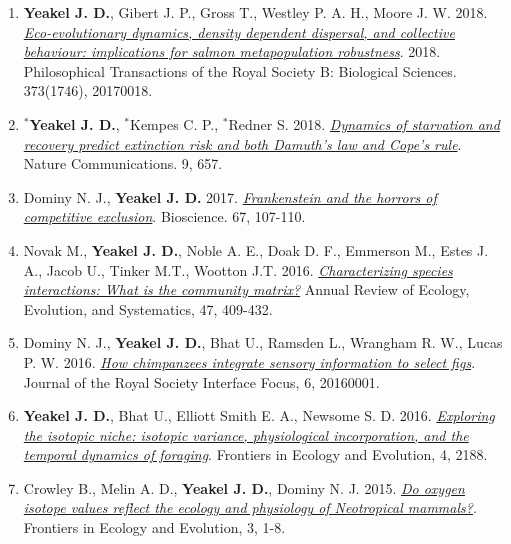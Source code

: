 \documentclass[margin,line,12pt]{res}
\begin{document}
\begin{resume}
\begin{enumerate}
\item \textbf{Yeakel J. D.}, Gibert J. P., Gross T., Westley P. A. H., Moore J. W. 2018. \href{https://royalsocietypublishing.org/doi/10.1098/rstb.2017.0018}{\emph{Eco-evolutionary dynamics, density dependent dispersal, and collective behaviour: implications for salmon metapopulation robustness}}. 2018. Philosophical Transactions of the Royal Society B: Biological Sciences. 373(1746), 20170018.

\item \textbf{${}^\ast$Yeakel J. D.}, ${}^\ast$Kempes C. P., ${}^\ast$Redner S. 2018. \href{https://www.nature.com/articles/s41467-018-02822-y}{\emph{Dynamics of starvation and recovery predict extinction risk and both Damuth's law and Cope's rule}}. Nature Communications. 9, 657.

\item Dominy N. J., \textbf{Yeakel J. D.} 2017. \href{https://academic.oup.com/bioscience/article-pdf/67/2/107/10251235/biw133.pdf}{\emph{Frankenstein and the horrors of competitive exclusion}}. Bioscience. 67, 107-110.

\item Novak M., \textbf{Yeakel J. D.}, Noble A. E., Doak D. F., Emmerson M., Estes J. A., Jacob U., Tinker M.T., Wootton J.T. 2016. \href{https://pubs.er.usgs.gov/publication/70173930}{\emph{Characterizing species interactions: What is the community matrix?}} Annual Review of Ecology, Evolution, and Systematics, 47, 409-432.

\item Dominy N. J., \textbf{Yeakel J. D.}, Bhat U., Ramsden L., Wrangham R. W., Lucas P. W. 2016. \href{https://royalsocietypublishing.org/doi/full/10.1098/rsfs.2016.0001}{\emph{How chimpanzees integrate sensory information to select figs}}. Journal of the Royal Society Interface Focus, 6, 20160001.

\item \textbf{Yeakel J. D.}, Bhat U., Elliott Smith E. A., Newsome S. D. 2016. \href{https://www.frontiersin.org/articles/10.3389/fevo.2016.00001/full}{\emph{Exploring the isotopic niche: isotopic variance, physiological incorporation, and the temporal dynamics of foraging}}. Frontiers in Ecology and Evolution, 4, 2188.

\item Crowley B., Melin A. D., \textbf{Yeakel J. D.}, Dominy N. J. 2015. \href{https://www.frontiersin.org/articles/10.3389/fevo.2015.00127/full}{\emph{Do oxygen isotope values reflect the ecology and physiology of Neotropical mammals?}}. Frontiers in Ecology and Evolution, 3, 1-8.


\end{enumerate}
\end{resume}
\end{document}
